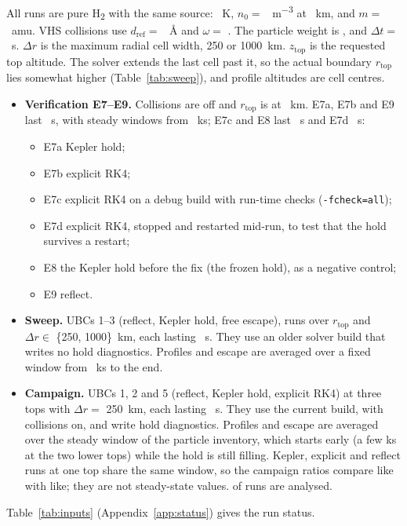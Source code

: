 \documentclass[10pt]{article}
\newcommand{\Htwo}{H\textsubscript{2}}
\newcommand{\minv}{m\textsuperscript{−3}}
\newcommand{\rtop}{r_\mathrm{top}}
\begin{document}
All runs are pure \Htwo{} with the same source: \oTzero{}~K, $n_0 = $ \oNzero{}~\minv{} at \oZzero{}~km, and $m = $ \oMass{}~amu. VHS collisions use $d_\mathrm{ref} = $ \oDref{}~Å and $\omega = $ \oOmega{}. The particle weight is \oWeight{}, and $\Delta t = $ \oDt{}~s. $\Delta r$ is the maximum radial cell width, 250 or 1000~km. $z_\mathrm{top}$ is the requested top altitude. The solver extends the last cell past it, so the actual boundary $\rtop$ lies somewhat higher (Table~\ref{tab:sweep}), and profile altitudes are cell centres.
\begin{itemize}
  \item \textbf{Verification E7–E9.} Collisions are off and $\rtop$ is at \verZtopKm{}~km. E7a, E7b and E9 last \verTend{}~s, with steady windows from \verTzero{}~ks; E7c and E8 last \verTendShort{}~s and E7d \verTendRestart{}~s:
    \begin{itemize}
      \item E7a Kepler hold;
      \item E7b explicit RK4;
      \item E7c explicit RK4 on a debug build with run-time checks (\texttt{-fcheck=all});
      \item E7d explicit RK4, stopped and restarted mid-run, to test that the hold survives a restart;
      \item E8 the Kepler hold before the fix (the frozen hold), as a negative control;
      \item E9 reflect.
    \end{itemize}
  \item \textbf{Sweep.} UBCs 1–3 (reflect, Kepler hold, free escape), \nSweepTotal{} runs over $\rtop$ and $\Delta r \in$ \{250, 1000\}~km, each lasting \sweepTend{}~s. They use an older solver build that writes no hold diagnostics. Profiles and escape are averaged over a fixed window from \profWindowReflect{}~ks to the end.
  \item \textbf{Campaign.} UBCs 1, 2 and 5 (reflect, Kepler hold, explicit RK4) at three tops with $\Delta r = $ 250~km, each lasting \campTend{}~s. They use the current build, with collisions on, and write hold diagnostics. Profiles and escape are averaged over the steady window of the particle inventory, which starts early (a few ks at the two lower tops) while the hold is still filling. Kepler, explicit and reflect runs at one top share the same window, so the campaign ratios compare like with like; they are not steady-state values. \campNdone{} of \campNtotal{} runs are analysed.
\end{itemize}
Table~\ref{tab:inputs} (Appendix~\ref{app:status}) gives the run status.
\end{document}
